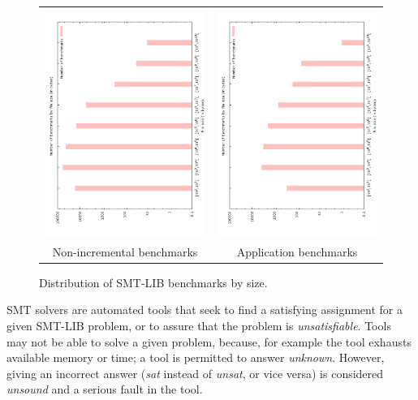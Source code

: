 \documentclass[twoside,11pt]{article}
\begin{document}
\begin{figure}
\begin{center}
\begin{tabular}{cc}
\includegraphics[angle=270,width=.5\textwidth]{smtlib2-file-count-by-size.pdf}
&
\includegraphics[angle=270,width=.5\textwidth]{smtlib2-app-file-count-by-size.pdf}
\\
Non-incremental benchmarks & Application benchmarks
\end{tabular}
\end{center}
\caption{Distribution of SMT-LIB benchmarks by size.
\label{fig:smtlib-bysize}}
\end{figure}

SMT solvers are automated tools that seek to find a satisfying assignment for a given SMT-LIB problem, or to assure that the problem is \emph{unsatisfiable}.
Tools may not be able to solve a given problem, because, for example the tool exhausts available memory or time; a tool is permitted to answer \emph{unknown}. However, giving an incorrect answer (\emph{sat} instead of \emph{unsat}, or vice versa) is considered \emph{unsound} and a serious fault in the tool.
\end{document}
